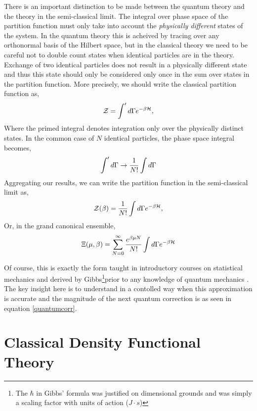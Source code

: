 There is an important distinction to be made between the quantum theory and the theory in the semi-classical limit.
The integral over phase space of the partition function must only take into account the \textit{physically different} states of the system.  
In the quantum theory this is acheived by tracing over any orthonormal basis of the Hilbert space, but in the classical theory we need to be careful not to double count states when identical particles are in the theory.
Exchange of two identical particles does not result in a physically different state and thus this state should only be considered only once in the sum over states in the partition function.
More precisely, we should write the classical partition function as,
%
\begin{equation}
    \mathcal{Z} = \int^\prime d\Gamma e^{-\beta \mathcal{H}},
\end{equation}
%
Where the primed integral denotes integration only over the physically distinct states. In the common case of $N$ identical particles, the phase space integral becomes, 
%
\begin{equation}
    \int^\prime d\Gamma \rightarrow \frac{1}{N!}\int d\Gamma
\end{equation}
%
Aggregating our results, we can write the partition function in the semi-classical limit as,
%
\begin{equation}
    \mathcal{Z}(\beta) = \frac{1}{N!}\int d\Gamma e^{-\beta \mathcal{H}},
\end{equation}
%
Or, in the grand canonical ensemble,
%
\begin{equation}
    \Xi(\mu, \beta) = \sum_{N = 0}^\infty \frac{e^{\beta\mu N}}{N!} \int d\Gamma e^{-\beta \mathcal{H}}
\end{equation}

Of course, this is exactly the form taught in introductory courses on statistical mechanics and derived by Gibbs\footnote{The $\hbar$ in Gibbs' formula was justified on dimensional grounds and was simply a scaling factor with units of action ($J\cdot s$)}prior to any knowledge of quantum mechanics \cite{Gibbs}.
The key insight here is to understand in a contolled way when this approximation is accurate and the magnitude of the next quantum correction is as seen in equation \ref{quantumcorr}.

\section{Classical Density Functional Theory}  %

